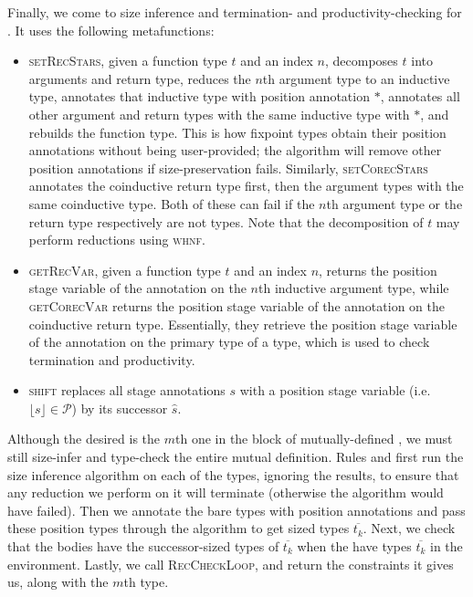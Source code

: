 \documentclass[sigplan,10pt,anonymous,review]{acmart}
\begin{document}
Finally, we come to size inference and termination- and productivity-checking for \cofixpoints. It uses the following metafunctions:
\begin{itemize}
    \item \textsc{setRecStars}, given a function type $t$ and an index $n$, decomposes $t$ into arguments and return type, reduces the $n$th argument type to an inductive type, annotates that inductive type with position annotation $*$, annotates all other argument and return types with the same inductive type with $*$, and rebuilds the function type. This is how fixpoint types obtain their position annotations without being user-provided; the algorithm will remove other position annotations if size-preservation fails. Similarly, \textsc{setCorecStars} annotates the coinductive return type first, then the argument types with the same coinductive type. Both of these can fail if the $n$th argument type or the return type respectively are not \coinductive types. Note that the decomposition of $t$ may perform reductions using \textsc{whnf}.
    \item \textsc{getRecVar}, given a function type $t$ and an index $n$, returns the position stage variable of the annotation on the $n$th inductive argument type, while \textsc{getCorecVar} returns the position stage variable of the annotation on the coinductive return type. Essentially, they retrieve the position stage variable of the annotation on the primary \corecursive type of a \cofixpoint type, which is used to check termination and productivity.
    \item \textsc{shift} replaces all stage annotations $s$ with a position stage variable (i.e. $\lfloor s \rfloor \in \mathcal{P}$) by its successor $\hat{s}$.
\end{itemize}

Although the desired \cofixpoint is the $m$th one in the block of mutually-defined \cofixpoints, we must still size-infer and type-check the entire mutual definition. Rules  and  first run the size inference algorithm on each of the \cofixpoint types, ignoring the results, to ensure that any reduction we perform on it will terminate (otherwise the algorithm would have failed). Then we annotate the bare types with position annotations and pass these position types through the algorithm to get sized types $\overline{t_k}$. Next, we check that the \cofixpoint bodies have the successor-sized types of $\overline{t_k}$ when the \cofixpoints have types $\overline{t_k}$ in the environment. Lastly, we call \textsc{RecCheckLoop}, and return the constraints it gives us, along with the $m$th \cofixpoint type.
\end{document}
